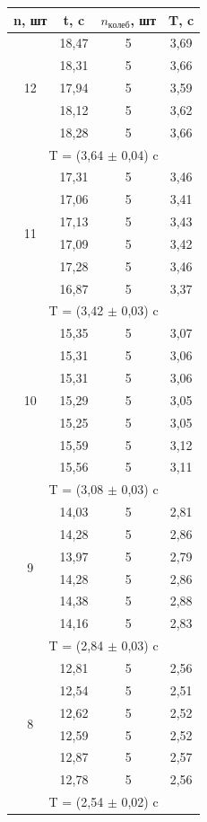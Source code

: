 \documentclass[a4paper,12pt]{article}
\begin{document}
\begin{center}
\begin{tabular}{|c|c|c|c|}
	\hline
	n, шт & t, c & $n_{колеб}$, шт & T, c \\
	\hline
	\multirow{5}{*}{12} & 18,47 & 5 & 3,69 \\
	\cline{2-4} & 18,31 & 5 & 3,66 \\
	\cline{2-4} & 17,94 & 5 & 3,59 \\
	\cline{2-4} & 18,12 & 5 & 3,62 \\
	\cline{2-4} & 18,28 & 5 & 3,66 \\
	\hline
	\multicolumn{4}{|c|}{T = (3,64 $\pm$ 0,04) c} \\
	\hline
	\multirow{6}{*}{11} & 17,31 & 5 & 3,46 \\
	\cline{2-4} & 17,06 & 5 & 3,41 \\
	\cline{2-4} & 17,13 & 5 & 3,43 \\
	\cline{2-4} & 17,09 & 5 & 3,42 \\
	\cline{2-4} & 17,28 & 5 & 3,46 \\
	\cline{2-4} & 16,87 & 5 & 3,37 \\
	\hline
	\multicolumn{4}{|c|}{T = (3,42 $\pm$ 0,03) c} \\
	\hline
	\multirow{7}{*}{10} & 15,35 & 5 & 3,07 \\
	\cline{2-4} & 15,31 & 5 & 3,06 \\
	\cline{2-4} & 15,31 & 5 & 3,06 \\
	\cline{2-4} & 15,29 & 5 & 3,05 \\
	\cline{2-4} & 15,25 & 5 & 3,05 \\
	\cline{2-4} & 15,59 & 5 & 3,12 \\
	\cline{2-4} & 15,56 & 5 & 3,11 \\	
	\hline
	\multicolumn{4}{|c|}{T = (3,08 $\pm$ 0,03) c} \\
	\hline
	\multirow{6}{*}{9} & 14,03 & 5 & 2,81 \\
	\cline{2-4} & 14,28 & 5 & 2,86 \\
	\cline{2-4} & 13,97 & 5 & 2,79 \\
	\cline{2-4} & 14,28 & 5 & 2,86 \\
	\cline{2-4} & 14,38 & 5 & 2,88 \\
	\cline{2-4} & 14,16 & 5 & 2,83 \\
	\hline
	\multicolumn{4}{|c|}{T = (2,84 $\pm$ 0,03) c} \\
	\hline
	\multirow{6}{*}{8} & 12,81 & 5 & 2,56 \\
	\cline{2-4} & 12,54 & 5 & 2,51 \\
	\cline{2-4} & 12,62 & 5 & 2,52 \\
	\cline{2-4} & 12,59 & 5 & 2,52 \\
	\cline{2-4} & 12,87 & 5 & 2,57 \\
	\cline{2-4} & 12,78 & 5 & 2,56 \\
	\hline
	\multicolumn{4}{|c|}{T = (2,54 $\pm$ 0,02) c} \\
	\hline
\end{tabular}
\end{center}
\end{document}
